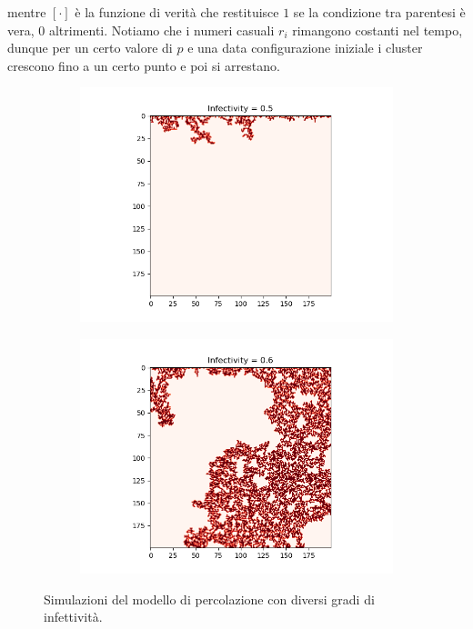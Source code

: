 \documentclass{article}
\begin{document}
    mentre $[\cdot]$ è la funzione di verità che restituisce $1$ se la condizione tra parentesi è vera, $0$ altrimenti.
    Notiamo che i numeri casuali $r_i$ rimangono costanti nel tempo, dunque per un certo valore di $p$ e una data
    configurazione iniziale i cluster crescono fino a un certo punto e poi si arrestano.\\
    \begin{figure}[H]
        \centering
        \begin{subfigure}[b]{0.49\linewidth}
         \centering
         \includegraphics[width=\linewidth]{../images/percolation_image1}
     \end{subfigure}
        \hfill
        \begin{subfigure}[b]{0.49\linewidth}
         \centering
         \includegraphics[width=\linewidth]{../images/percolation_image2}
     \end{subfigure}
     \caption{Simulazioni del modello di percolazione con diversi gradi di infettività.}
     \label{fig:percolation_image}
    \end{figure}
\end{document}

